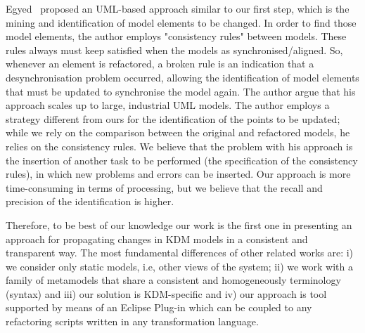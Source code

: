 Egyed~\cite{Egyed:2006:ICC:1134285.1134339} proposed an UML-based approach similar to our first step, which is the mining and identification of model elements to be changed. In order to find those model elements, the author employs "consistency rules" between models. These rules always must keep satisfied when the models as synchronised/aligned. So, whenever an element is refactored, a broken rule is an indication that a desynchronisation problem occurred, allowing the identification of model elements that must be updated to synchronise the model again. The author argue that his approach scales up to large, industrial UML models. The author employs a strategy different from ours for the identification of the points to be updated; while we rely on the comparison between the original and refactored models, he relies on the consistency rules. We believe that the problem with his approach is the insertion of another task to be performed (the specification of the consistency rules), in which new problems and errors can be inserted. Our approach is more time-consuming in terms of processing, but we believe that the recall and precision of the identification is higher.

Therefore, to be best of our knowledge our work is the first one in presenting an approach for propagating changes in KDM models in a consistent and transparent way. The most fundamental differences of other related works are: i) we consider only static models, i.e, other views of the system; ii) we work with a family of metamodels that share a consistent and homogeneously terminology (syntax) and iii) our solution is KDM-specific and iv) our approach is tool supported by means of an Eclipse Plug-in which can be coupled to any refactoring scripts written in any transformation language. 




